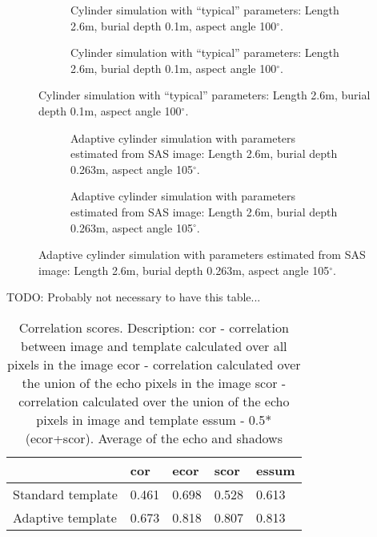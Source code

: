 \documentclass[
   UAM                                          %
 , 12pt                                         %
 , bibtex                                       %
 , layout
]{common/mytemplate}
\begin{document}
\begin{figure}[tp]\centering%
\begin{subfigure}[b]{.5\linewidth-\imgspacing/2}
%
\caption{Cylinder simulation with ``typical'' parameters: Length 2.6\;m, burial depth 0.1\;m, aspect angle 100$^\circ$. }\label{sim_cylinder}%
\end{subfigure}\hspace{\imgspacing}%
\begin{subfigure}[b]{.5\linewidth-\imgspacing/2}
%
\caption{Cylinder simulation with ``typical'' parameters: Length 2.6\;m, burial depth 0.1\;m, aspect angle 100$^\circ$.}\label{sim_cylinder_bw}%
\end{subfigure} 
\end{figure}

\begin{figure}[tp]\centering%
\begin{subfigure}[b]{.5\linewidth-\imgspacing/2}
%
\caption{Adaptive cylinder simulation with parameters estimated from SAS image: Length 2.6\;m, burial depth 0.263\;m, aspect angle 105$^\circ$.}\label{sim_cylinder}%
\end{subfigure}\hspace{\imgspacing}%
\begin{subfigure}[b]{.5\linewidth-\imgspacing/2}
%
\caption{Adaptive cylinder simulation with parameters estimated from SAS image: Length 2.6\;m, burial depth 0.263\;m, aspect angle 105$^\circ$.}\label{sim_cylinder_bw}%
\end{subfigure} 
\end{figure}



\begin{table}[bh]
TODO: Probably not necessary to have this table...\\
\begin{tabular}[c]{l l l l l}\hline
\rowcolor{tabBlue} & cor   & ecor  & scor  & essum \\\hline
Standard template & 0.461 & 0.698 & 0.528 & 0.613 \\
Adaptive template & 0.673 & 0.818 & 0.807 & 0.813
\end{tabular}
\caption{Correlation scores. Description:\newline
cor - correlation between image and template calculated over all pixels in the image\newline
ecor - correlation calculated over the union of the echo pixels in the image\newline
scor - correlation calculated over the union of the echo pixels in image and template\newline
essum - 0.5*(ecor+scor). Average of the echo and shadows}
\end{table}
\end{document}
